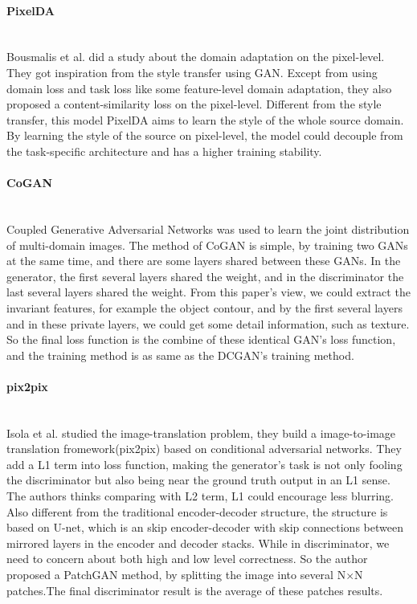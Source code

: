 \documentclass{kththesis}
\begin{document}
\paragraph{PixelDA}~{}\\


\noindent Bousmalis et al.\cite{bousmalis2016unsupervised} did a study about the domain adaptation on the pixel-level. They got inspiration from the style transfer \cite{gatys2016image,johnson2016perceptual} using GAN. Except from using domain loss and task loss like some feature-level domain adaptation\cite{ganin2015unsupervised,ganin2016domain,tzeng2017adversarial}, they also proposed a content-similarity loss on the pixel-level. Different from the style transfer, this model PixelDA aims to learn the style of the whole source domain. By learning the style of the source on pixel-level, the model could decouple from the task-specific architecture and has a higher training stability. 

\paragraph{CoGAN}~{}\\

\noindent Coupled Generative Adversarial Networks\cite{liu2016coupled} was used to learn the joint distribution of multi-domain images. The method of CoGAN is simple, by training two GANs at the same time, and there are some layers shared between these GANs. In the generator, the first several layers shared the weight, and in the discriminator the last several layers shared the weight. From this paper's view, we could extract the invariant features, for example the object contour, and by the first several layers and in these private layers, we could get some detail information, such as texture. So the final loss function is the combine of these identical GAN's loss function, and the training method is as same as the DCGAN's \cite{radford2015unsupervised} training method. 

\paragraph{pix2pix}~{}\\

\noindent Isola et al.\cite{isola2016image} studied the image-translation problem, they build a image-to-image translation fromework(pix2pix) based on conditional adversarial networks\cite{mirza2014conditional}. They add a L1 term into loss function, making the generator's task is not only fooling the discriminator but also being near the ground truth output in an L1 sense. The authors thinks comparing with L2 term, L1 could encourage less blurring. Also different from the traditional encoder-decoder structure, the structure is based on U-net\cite{ronneberger2015u}, which is an skip encoder-decoder with skip connections between mirrored layers in the encoder and decoder stacks. While in discriminator, we need to concern about both high and low level correctness. So the author proposed a PatchGAN method, by splitting the image into several N$\times$N patches.The final discriminator result is the average of these patches results. 
\end{document}
